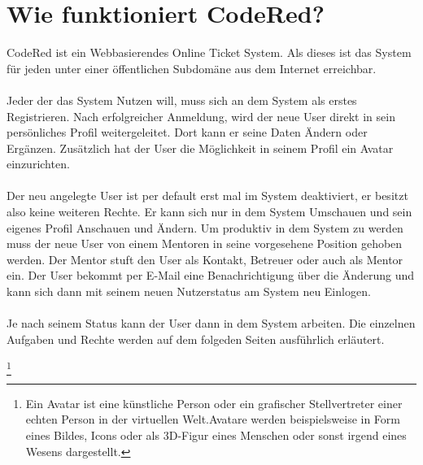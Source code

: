 \chapter{Wie funktioniert CodeRed?}  %
\label{chapter:Wie funktioniert CodeRed?}  %

CodeRed ist ein Webbasierendes Online Ticket System. Als dieses ist das System für jeden unter einer öffentlichen Subdomäne aus dem Internet erreichbar. \\
\\
Jeder der das System Nutzen will, muss sich an dem System als erstes Registrieren. Nach erfolgreicher Anmeldung, wird der neue User direkt in sein persönliches Profil weitergeleitet. Dort kann er seine Daten Ändern oder Ergänzen. Zusätzlich hat der User die Möglichkeit in seinem Profil ein Avatar einzurichten.\footnotemark[1] \\
\\
Der neu angelegte User ist per default erst mal im System deaktiviert, er besitzt also keine weiteren Rechte. Er kann sich nur in dem System Umschauen und sein eigenes Profil Anschauen und Ändern. Um produktiv in dem System zu werden muss der neue User von einem Mentoren in seine vorgesehene Position gehoben werden. Der Mentor stuft den User als Kontakt, Betreuer oder auch als Mentor ein. Der User bekommt per E-Mail eine Benachrichtigung über die Änderung und kann sich dann mit seinem neuen Nutzerstatus am System neu Einlogen.\\ 
\\
Je nach seinem Status kann der User dann in dem System arbeiten. Die einzelnen Aufgaben und Rechte werden auf dem folgeden Seiten ausführlich erläutert.


\footnote[1]{Ein Avatar ist eine künstliche Person oder ein grafischer Stellvertreter einer echten Person in der virtuellen Welt.Avatare werden beispielsweise in Form eines Bildes, Icons oder als 3D-Figur eines Menschen oder sonst irgend eines Wesens dargestellt.}  



